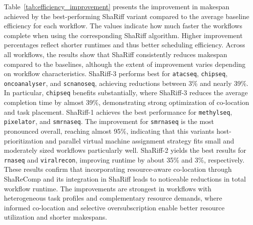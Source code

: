 \noindent
Table~\ref{tab:efficiency_improvement} presents the improvement in makespan achieved by the best-performing ShaRiff variant compared to the average baseline efficiency for each workflow. The values indicate how much faster the workflows complete when using the corresponding ShaRiff algorithm. Higher improvement percentages reflect shorter runtimes and thus better scheduling efficiency.
Across all workflows, the results show that ShaRiff consistently reduces makespan compared to the baselines, although the extent of improvement varies depending on workflow characteristics. ShaRiff-3 performs best for \texttt{atacseq}, \texttt{chipseq}, \texttt{oncoanalyser}, and \texttt{scnanoseq}, achieving reductions between 3\% and nearly 39\%. In particular, \texttt{chipseq} benefits substantially, where ShaRiff-3 reduces the average completion time by almost 39\%, demonstrating strong optimization of co-location and task placement.
ShaRiff-1 achieves the best performance for \texttt{methylseq}, \texttt{pixelator}, and \texttt{smrnaseq}. The improvement for \texttt{smrnaseq} is the most pronounced overall, reaching almost 95\%, indicating that this variants host-prioritization and parallel virtual machine assignment strategy fits small and moderately sized workflows particularly well. ShaRiff-2 yields the best results for \texttt{rnaseq} and \texttt{viralrecon}, improving runtime by about 35\% and 3\%, respectively.
These results confirm that incorporating resource-aware co-location through ShaReComp and its integration in ShaRiff leads to noticeable reductions in total workflow runtime. The improvements are strongest in workflows with heterogeneous task profiles and complementary resource demands, where informed co-location and selective oversubscription enable better resource utilization and shorter makespans.


